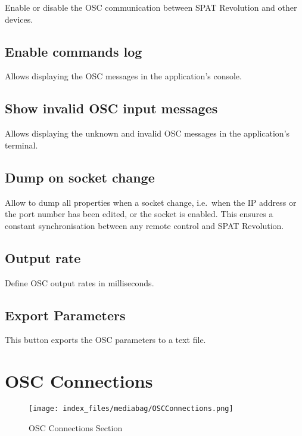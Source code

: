 \documentclass[
  letterpaper,
  DIV=11,
  numbers=noendperiod]{scrreport}
\begin{document}
Enable or disable the OSC communication between SPAT Revolution and
other devices.

\hypertarget{enable-commands-log}{%
\subsection{Enable commands log}\label{enable-commands-log}}

Allows displaying the OSC messages in the application's console.

\hypertarget{show-invalid-osc-input-messages}{%
\subsection{Show invalid OSC input
messages}\label{show-invalid-osc-input-messages}}

Allows displaying the unknown and invalid OSC messages in the
application's terminal.

\hypertarget{dump-on-socket-change}{%
\subsection{Dump on socket change}\label{dump-on-socket-change}}

Allow to dump all properties when a socket change, i.e.~when the IP
address or the port number has been edited, or the socket is enabled.
This ensures a constant synchronisation between any remote control and
SPAT Revolution.

\hypertarget{output-rate}{%
\subsection{Output rate}\label{output-rate}}

Define OSC output rates in milliseconds.

\hypertarget{export-parameters}{%
\subsection{Export Parameters}\label{export-parameters}}

This button exports the OSC parameters to a text file.

\hypertarget{osc-connections}{%
\section{OSC Connections}\label{osc-connections}}

\begin{figure}

{\centering \texttt{[image: index\_files/mediabag/OSCConnections.png]}

}

\caption{OSC Connections Section}

\end{figure}
\end{document}
